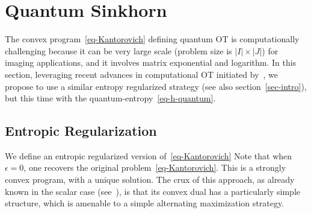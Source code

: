 
\section{Quantum Sinkhorn}
\label{eq-q-sink}

The convex program~\eqref{eq-Kantorovich} defining quantum OT is computationally challenging because it can be very large scale (problem size is $|I| \times |J|$) for imaging applications, and it involves matrix exponential and logarithm. In this section, leveraging recent advances in computational OT initiated by~\cite{cuturi-2013}, we propose to use a similar entropy regularized strategy (see also section~\ref{sec-intro}), but this time with the quantum-entropy~\eqref{eq-h-quantum}. 

\subsection{Entropic Regularization}

We define an entropic regularized version of~\eqref{eq-Kantorovich}
Note that when $\epsilon=0$, one recovers the original problem~\eqref{eq-Kantorovich}. 
%
This is a strongly convex program, with a unique solution. The crux of this approach, as already known in the scalar case (see~\cite{2016-chizat-sinkhorn}), is that its convex dual has a particularly simple structure, which is amenable to a simple alternating maximization strategy. 

